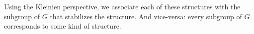 \documentclass[11pt,oneside]{article}
\begin{document}
Using the Kleinien perspective, we associate
each of these structures with the subgroup of $G$
that stabilizes the structure.
And vice-versa: every subgroup of $G$ corresponds
to some kind of structure.


\end{document}
